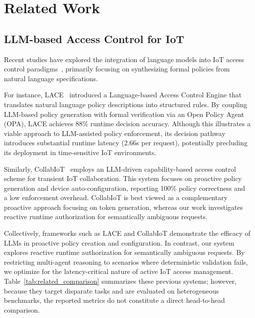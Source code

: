 \documentclass[
]{ceurart}
\begin{document}
\section{Related Work}\label{sec:related_work}

\subsection{LLM-based Access Control for IoT}

Recent studies have explored the integration of language models into IoT access control paradigms~\cite{llm4iot2024, edgegenai2024}, primarily focusing on synthesizing formal policies from natural language specifications.

For instance, LACE~\cite{lace2025} introduced a Language-based Access Control Engine that translates natural language policy descriptions into structured rules. By coupling LLM-based policy generation with formal verification via an Open Policy Agent (OPA), LACE achieves 88\% runtime decision accuracy. Although this illustrates a viable approach to LLM-assisted policy enforcement, its decision pathway introduces substantial runtime latency (2.66s per request), potentially precluding its deployment in time-sensitive IoT environments.

Similarly, CollabIoT~\cite{shastri2025llmdrivenautoconfigurationtransient} employs an LLM-driven capability-based access control scheme for transient IoT collaboration. This system focuses on proactive policy generation and device auto-configuration, reporting 100\% policy correctness and a low enforcement overhead. CollabIoT is best viewed as a complementary proactive approach focusing on token generation, whereas our work investigates reactive runtime authorization for semantically ambiguous requests.

Collectively, frameworks such as LACE and CollabIoT demonstrate the efficacy of LLMs in proactive policy creation and configuration. In contrast, our system explores reactive runtime authorization for semantically ambiguous requests. By restricting multi-agent reasoning to scenarios where deterministic validation fails, we optimize for the latency-critical nature of active IoT access management. Table~\ref{tab:related_comparison} summarizes these previous systems; however, because they target disparate tasks and are evaluated on heterogeneous benchmarks, the reported metrics do not constitute a direct head-to-head comparison.
\end{document}

